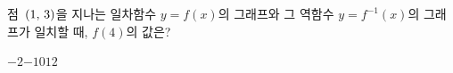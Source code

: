\hspace*{2mm}\begin{minipage}[t]{\dimexpr\linewidth-2mm\relax}\vspace{0pt}
점~$(1,\mkern3mu 3)$을 지나는 일차함수 $y=f(x)$의 그래프와 그 역함수 $y=f^{-1}(x)$의 그래프가 일치할 때, $f(4)$의 값은?
\begin{choices32}{$-2$}{$-1$}{$0$}{$1$}{$2$}\end{choices32}\end{minipage}
